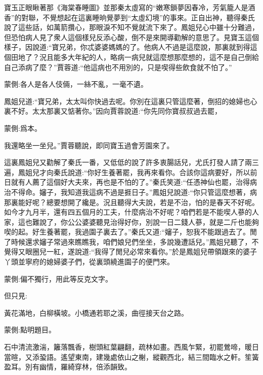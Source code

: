 \begin{parag}
    寶玉正眼瞅著那《海棠春睡圖》並那秦太虛寫的“嫩寒鎖夢因春冷，芳氣籠人是酒香”的對聯，不覺想起在這裏睡晌覺夢到“太虛幻境”的事來。正自出神，聽得秦氏說了這些話，如萬箭攢心，那眼淚不知不覺就流下來了。鳳姐兒心中雖十分難過，但恐怕病人見了衆人這個樣兒反添心酸，倒不是來開導勸解的意思了。見寶玉這個樣子，因說道:“寶兄弟，你忒婆婆媽媽的了。他病人不過是這麼說，那裏就到得這個田地了？況且能多大年紀的人，略病一病兒就這麼想那麼想的，這不是自己倒給自己添病了麼？”賈蓉道:“他這病也不用別的，只是喫得些飲食就不怕了。”\begin{note}蒙側:各人是各人伎倆，一絲不亂，一毫不遺。\end{note}鳳姐兒道:“寶兄弟，太太叫你快過去呢。你別在這裏只管這麼著，倒招的媳婦也心裏不好。太太那裏又惦著你。”因向賈蓉說道:“你先同你寶叔叔過去罷，\begin{note}蒙側:爲本。\end{note}我還略坐一坐兒。”賈蓉聽說，即同寶玉過會芳園來了。
\end{parag}


\begin{parag}
    這裏鳳姐兒又勸解了秦氏一番，又低低的說了許多衷腸話兒，尤氏打發人請了兩三遍，鳳姐兒才向秦氏說道:“你好生養著罷，我再來看你。合該你這病要好，所以前日就有人薦了這個好大夫來，再也是不怕的了。”秦氏笑道:“任憑神仙也罷，治得病治不得命。嬸子，我知道我這病不過是捱日子。”鳳姐兒說道:“你只管這麼想著，病那裏能好呢？總要想開了纔是。況且聽得大夫說，若是不治，怕的是春天不好呢。如今才九月半，還有四五個月的工夫，什麼病治不好呢？咱們若是不能喫人蔘的人家，這也難說了，你公公婆婆聽見治得好你，別說一日二錢人蔘，就是二斤也能夠喫的起。好生養著罷，我過園子裏去了。”秦氏又道:“嬸子，恕我不能跟過去了。閒了時候還求嬸子常過來瞧瞧我，咱們娘兒們坐坐，多說幾遭話兒。”鳳姐兒聽了，不覺得又眼圈兒一紅，遂說道:“我得了閒兒必常來看你。”於是鳳姐兒帶領跟來的婆子丫頭並寧府的媳婦婆子們，從裏頭繞進園子的便門來。\begin{note}蒙側:偏不獨行，用此等反克文字。\end{note}但只見:
\end{parag}


\begin{qute2sp}
    黃花滿地，白柳橫坡。小橋通若耶之溪，曲徑接天台之路。\begin{note}蒙側:點明題目。\end{note}石中清流激湍，籬落飄香，樹頭紅葉翩翻，疏林如畫。西風乍緊，初罷鶯啼，暖日當暄，又添蛩語。遙望東南，建幾處依山之榭，縱觀西北，結三間臨水之軒。笙簧盈耳。別有幽情，羅綺穿林，倍添韻致。
\end{qute2sp}


